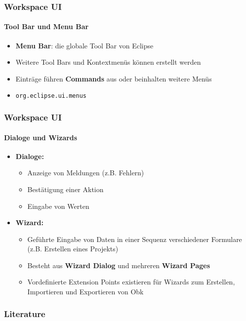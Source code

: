 {\begin{frame}
  \frametitle{Workspace UI}
  \framesubtitle{Tool Bar und Menu Bar}
  \begin{itemize}
    \item \textbf{Menu Bar}: die globale Tool Bar von Eclipse
    \item Weitere Tool Bars und Kontextmenüs können erstellt werden
    \item Einträge führen \textbf{Commands} aus oder beinhalten weitere Menüs
    \item \texttt{org.eclipse.ui.menus}
  \end{itemize}
\end{frame}

\begin{frame}
  \frametitle{Workspace UI}
  \framesubtitle{Dialoge und Wizards}
  \begin{itemize}
    \item \textbf{Dialoge:}
    \begin{itemize}
      \item Anzeige von Meldungen (z.B. Fehlern)
      \item Bestätigung einer Aktion
      \item Eingabe von Werten
    \end{itemize}
    \item \textbf{Wizard:}
    \begin{itemize}
      \item Geführte Eingabe von Daten in einer Sequenz verschiedener Formulare (z.B. Erstellen eines Projekts)
      \item Besteht aus \textbf{Wizard Dialog} und mehreren \textbf{Wizard Pages}
      \item Vordefinierte Extension Points existieren für Wizards zum Erstellen, Importieren und Exportieren von Obk
    \end{itemize}
  \end{itemize}
\end{frame}



\begin{frame}
\frametitle{Literature}

\end{frame}


}